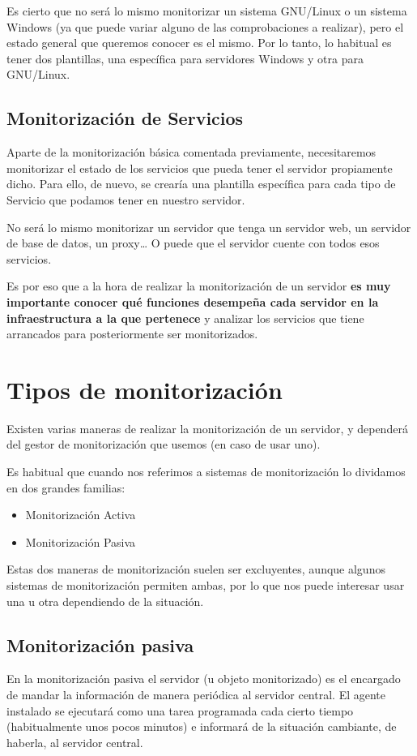 Es cierto que no será lo mismo monitorizar un sistema GNU/Linux o un sistema Windows (ya que puede variar alguno de las comprobaciones a realizar), pero el estado general que queremos conocer es el mismo. Por lo tanto, lo habitual es tener dos plantillas, una específica para servidores Windows y otra para GNU/Linux.


\subsection{Monitorización de Servicios}
Aparte de la monitorización básica comentada previamente, necesitaremos monitorizar el estado de los servicios que pueda tener el servidor propiamente dicho. Para ello, de nuevo, se crearía una plantilla específica para cada tipo de Servicio que podamos tener en nuestro servidor.

No será lo mismo monitorizar un servidor que tenga un servidor web, un servidor de base de datos, un proxy… O puede que el servidor cuente con todos esos servicios.

Es por eso que a la hora de realizar la monitorización de un servidor \textbf{es muy importante conocer qué funciones desempeña cada servidor en la infraestructura a la que pertenece} y analizar los servicios que tiene arrancados para posteriormente ser monitorizados.



\section{Tipos de monitorización}
Existen varias maneras de realizar la monitorización de un servidor, y dependerá del gestor de monitorización que usemos (en caso de usar uno).

Es habitual que cuando nos referimos a sistemas de monitorización lo dividamos en dos grandes familias:
\begin{itemize}
    \item Monitorización Activa
    \item Monitorización Pasiva
\end{itemize}

Estas dos maneras de monitorización suelen ser excluyentes, aunque algunos sistemas de monitorización permiten ambas, por lo que nos puede interesar usar una u otra dependiendo de la situación.


\subsection{Monitorización pasiva}
En la monitorización pasiva el servidor (u objeto monitorizado) es el encargado de mandar la información de manera periódica al servidor central. El agente instalado se ejecutará como una tarea programada cada cierto tiempo (habitualmente unos pocos minutos) e informará de la situación cambiante, de haberla, al servidor central.


